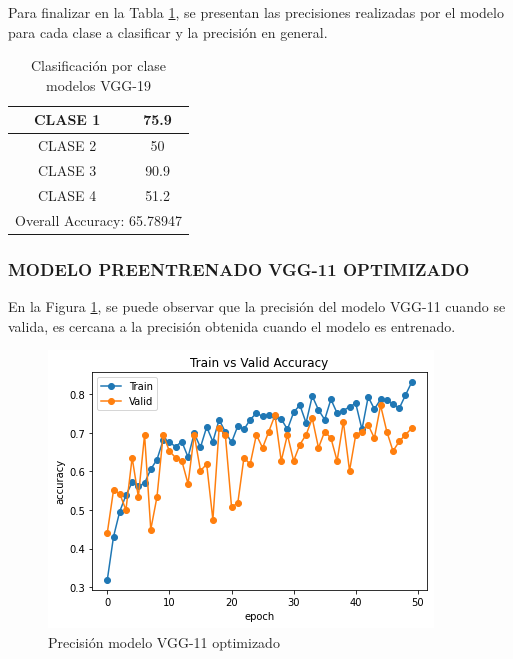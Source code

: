 	Para finalizar en la Tabla \ref{tab:VGG19optclases}, se presentan las precisiones realizadas por el modelo para cada clase a clasificar y la precisión en general.
		\begin{table}[htbp]
			\centering
			\begin{tabular}{|c|c|}
				\hline
				CLASE 1 & 75.9 \bigstrut\\
				\hline
				CLASE 2 & 50 \bigstrut\\
				\hline
				CLASE 3 & 90.9 \bigstrut\\
				\hline
				CLASE 4 & 51.2 \bigstrut\\
				\hline
				\multicolumn{2}{|c|}{Overall Accuracy: 65.78947} \bigstrut\\
				\hline
			\end{tabular}%
			\caption{Clasificación por clase modelos VGG-19}
			\label{tab:VGG19optclases}%
		\end{table}%

\newpage	
	\subsubsection{\MakeUppercase{Modelo preentrenado VGG-11 optimizado}}
	En la Figura \ref{fig:preci_vgg11_OPT}, se puede observar que la precisión del modelo VGG-11 cuando se valida, es cercana a la precisión obtenida cuando el modelo es entrenado.
	
		\begin{figure}[ht]
			\centering
			\includegraphics[scale=0.6]{Figs/508.png}
			\caption{Precisión modelo VGG-11 optimizado}
			\label{fig:preci_vgg11_OPT}
		\end{figure}
	

